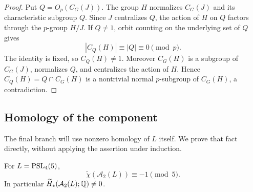 \begin{proof}
Put $Q=O_p(C_G(J))$. The group $H$ normalizes $C_G(J)$ and its
characteristic subgroup $Q$. Since $J$ centralizes $Q$, the action
of $H$ on $Q$ factors through the $p$-group $H/J$.
If $Q\ne1$, orbit counting on the underlying set of $Q$ gives
\[
 |C_Q(H)|\equiv |Q|\equiv0\pmod p.
\]
The identity is fixed, so $C_Q(H)\ne1$. Moreover $C_G(H)$ is a
subgroup of $C_G(J)$, normalizes $Q$, and centralizes the action of
$H$. Hence
$C_Q(H)=Q\cap C_G(H)$ is a nontrivial normal $p$-subgroup of
$C_G(H)$, a contradiction.
\end{proof}

\subsection{Homology of the component}

The final branch will use nonzero homology of $L$ itself. We prove
that fact directly, without applying the assertion under induction.

\begin{lemma}\label{lem:psl45-homology}
For $L=\operatorname{PSL}_4(5)$,
\[
 \widetilde\chi(\mathcal A_2(L))\equiv-1\pmod5.
\]
In particular $\widetilde H_*(\mathcal A_2(L);\mathbb Q)\ne0$.
\end{lemma}


